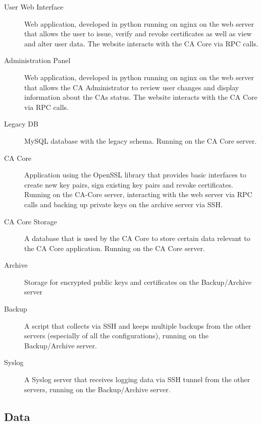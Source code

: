 \documentclass[a4paper, toc=index, 12pt, DIV14, twoside, BCOR2cm, headsepline, numbers=noenddot, bibliography=totoc]{scrbook}
\begin{document}
\begin{description}

\item[User Web Interface] Web application, developed in python running on nginx on the web server that allows the user to issue, verify and revoke certificates as well as view and alter user data. The website interacts with the CA Core via RPC calls.

\item[Administration Panel] Web application, developed in python running on nginx on the web server that allows the CA Administrator to review user changes and display information about the CAs status. The website interacts with the CA Core via RPC calls.

\item[Legacy DB] MySQL database with the legacy schema. Running on the CA Core server.

\item[CA Core] Application using the OpenSSL library that provides basic interfaces to create new key pairs, sign existing key pairs and revoke certificates. Running on the CA-Core server,  interacting with the web server via RPC calls and backing up private keys on the archive server via SSH.

\item[CA Core Storage] A database that is used by the CA Core to store certain data relevant to the CA Core application. Running on the CA Core server.

\item[Archive] Storage for encrypted public keys and certificates on the Backup/Archive server

\item[Backup] A script that collects via SSH and keeps multiple backups from the other servers (especially of all the configurations), running on the Backup/Archive server.

\item[Syslog] A Syslog server that receives logging data via SSH tunnel from the other servers, running on the Backup/Archive server.
\end{description}

\subsection{Data}
\end{document}
